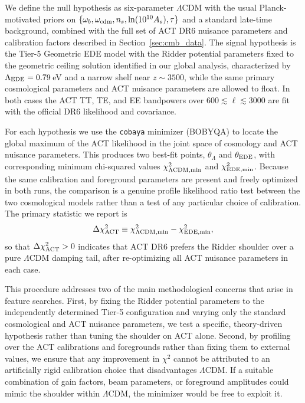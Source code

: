 \documentclass[a4paper,11pt]{article}
\begin{document}
We define the null hypothesis as six-parameter $\Lambda$CDM with the usual Planck-motivated priors on $\{\omega_b,\omega_{\rm cdm},n_s,\ln(10^{10}A_s),\tau\}$ and a standard late-time background, combined with the full set of ACT DR6 nuisance parameters and calibration factors described in Section~\ref{sec:cmb_data}. The signal hypothesis is the Tier-5 Geometric EDE model with the Ridder potential parameters fixed to the geometric ceiling solution identified in our global analysis, characterized by $\Lambda_{\rm EDE}=0.79$\,eV and a narrow shelf near $z \sim 3500$, while the same primary cosmological parameters and ACT nuisance parameters are allowed to float. In both cases the ACT TT, TE, and EE bandpowers over $600 \lesssim \ell \lesssim 3000$ are fit with the official DR6 likelihood and covariance.

For each hypothesis we use the \texttt{cobaya} minimizer (BOBYQA) to locate the global maximum of the ACT likelihood in the joint space of cosmology and ACT nuisance parameters. This produces two best-fit points, $\theta_{\Lambda}$ and $\theta_{\rm EDE}$, with corresponding minimum chi-squared values $\chi^2_{\Lambda{\rm CDM,min}}$ and $\chi^2_{{\rm EDE,min}}$. Because the same calibration and foreground parameters are present and freely optimized in both runs, the comparison is a genuine profile likelihood ratio test between the two cosmological models rather than a test of any particular choice of calibration. The primary statistic we report is
\begin{equation}
\Delta \chi^2_{\rm ACT}
\equiv
\chi^2_{\Lambda{\rm CDM,min}} - \chi^2_{{\rm EDE,min}},
\end{equation}
so that $\Delta \chi^2_{\rm ACT} > 0$ indicates that ACT DR6 prefers the Ridder shoulder over a pure $\Lambda$CDM damping tail, after re-optimizing all ACT nuisance parameters in each case.

This procedure addresses two of the main methodological concerns that arise in feature searches. First, by fixing the Ridder potential parameters to the independently determined Tier-5 configuration and varying only the standard cosmological and ACT nuisance parameters, we test a specific, theory-driven hypothesis rather than tuning the shoulder on ACT alone. Second, by profiling over the ACT calibrations and foregrounds rather than fixing them to external values, we ensure that any improvement in $\chi^2$ cannot be attributed to an artificially rigid calibration choice that disadvantages $\Lambda$CDM. If a suitable combination of gain factors, beam parameters, or foreground amplitudes could mimic the shoulder within $\Lambda$CDM, the minimizer would be free to exploit it.
\end{document}
